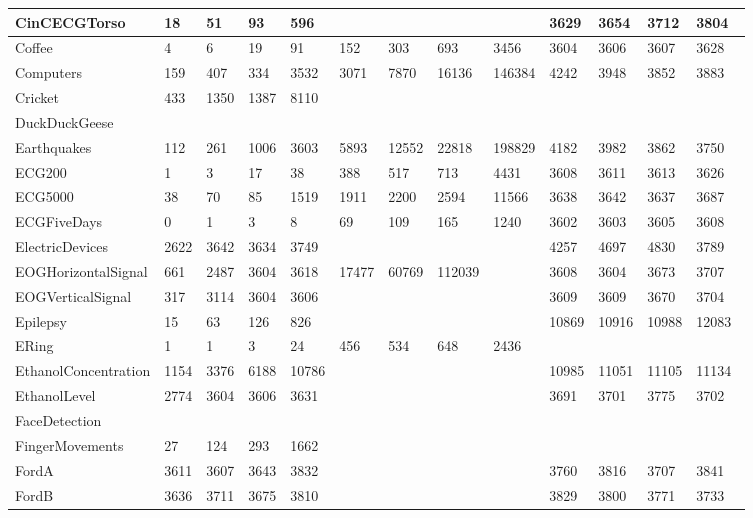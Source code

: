\begin{landscape}
\begin{longtable}{|l|llll|llll|llll|}
      CinCECGTorso & 18 & 51 & 93 & 596 &  &  &  &  & 3629 & 3654 & 3712 & 3804 \\ \hline
      Coffee & 4 & 6 & 19 & 91 & 152 & 303 & 693 & 3456 & 3604 & 3606 & 3607 & 3628 \\ \hline
      Computers & 159 & 407 & 334 & 3532 & 3071 & 7870 & 16136 & 146384 & 4242 & 3948 & 3852 & 3883 \\ \hline
      Cricket & 433 & 1350 & 1387 & 8110 &  &  &  &  &  &  &  &  \\ \hline
      DuckDuckGeese &  &  &  &  &  &  &  &  &  &  &  &  \\ \hline
      Earthquakes & 112 & 261 & 1006 & 3603 & 5893 & 12552 & 22818 & 198829 & 4182 & 3982 & 3862 & 3750 \\ \hline
      ECG200 & 1 & 3 & 17 & 38 & 388 & 517 & 713 & 4431 & 3608 & 3611 & 3613 & 3626 \\ \hline
      ECG5000 & 38 & 70 & 85 & 1519 & 1911 & 2200 & 2594 & 11566 & 3638 & 3642 & 3637 & 3687 \\ \hline
      ECGFiveDays & 0 & 1 & 3 & 8 & 69 & 109 & 165 & 1240 & 3602 & 3603 & 3605 & 3608 \\ \hline
      ElectricDevices & 2622 & 3642 & 3634 & 3749 &  &  &  &  & 4257 & 4697 & 4830 & 3789 \\ \hline
      EOGHorizontalSignal & 661 & 2487 & 3604 & 3618 & 17477 & 60769 & 112039 &  & 3608 & 3604 & 3673 & 3707 \\ \hline
      EOGVerticalSignal & 317 & 3114 & 3604 & 3606 &  &  &  &  & 3609 & 3609 & 3670 & 3704 \\ \hline
      Epilepsy & 15 & 63 & 126 & 826 &  &  &  &  & 10869 & 10916 & 10988 & 12083 \\ \hline
      ERing & 1 & 1 & 3 & 24 & 456 & 534 & 648 & 2436 &  &  &  &  \\ \hline
      EthanolConcentration & 1154 & 3376 & 6188 & 10786 &  &  &  &  & 10985 & 11051 & 11105 & 11134 \\ \hline
      EthanolLevel & 2774 & 3604 & 3606 & 3631 &  &  &  &  & 3691 & 3701 & 3775 & 3702 \\ \hline
      FaceDetection &  &  &  &  &  &  &  &  &  &  &  &  \\ \hline
      FingerMovements & 27 & 124 & 293 & 1662 &  &  &  &  &  &  &  &  \\ \hline
      FordA & 3611 & 3607 & 3643 & 3832 &  &  &  &  & 3760 & 3816 & 3707 & 3841 \\ \hline
      FordB & 3636 & 3711 & 3675 & 3810 &  &  &  &  & 3829 & 3800 & 3771 & 3733 \\ \hline

\end{longtable}
\end{landscape}
